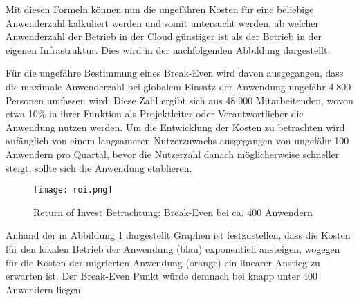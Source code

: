 Mit diesen Formeln können nun die ungefähren Kosten für eine beliebige Anwenderzahl kalkuliert werden und somit untersucht werden, ab welcher Anwenderzahl der Betrieb in der Cloud günstiger ist als der Betrieb in der eigenen Infrastruktur. Dies wird in der nachfolgenden Abbildung dargestellt. \pagebreak

Für die ungefähre Bestimmung eines Break-Even wird davon ausgegangen, dass die maximale Anwenderzahl bei globalem Einsatz der Anwendung ungefähr 4.800 Personen umfassen wird. Diese Zahl ergibt sich aus 48.000 Mitarbeitenden, wovon etwa 10\% in ihrer Funktion als Projektleiter oder Verantwortlicher die Anwendung nutzen werden. Um die Entwicklung der Kosten zu betrachten wird anfänglich von einem langsameren Nutzerzuwachs ausgegangen von ungefähr 100 Anwendern pro Quartal, bevor die Nutzerzahl danach möglicherweise schneller steigt, sollte sich die Anwendung etablieren.

\begin{figure}[H]
    \centering
    \texttt{[image: roi.png]}
    \caption{Return of Invest Betrachtung: Break-Even bei ca. 400 Anwendern}
    \label{fig:roi}
\end{figure}

Anhand der in Abbildung \ref{fig:roi} dargestellt Graphen ist festzustellen, dass die Kosten für den lokalen Betrieb der Anwendung (blau) exponentiell ansteigen, wogegen für die Kosten der migrierten Anwendung (orange) ein linearer Anstieg zu erwarten ist. Der Break-Even Punkt würde demnach bei knapp unter 400 Anwendern liegen.






